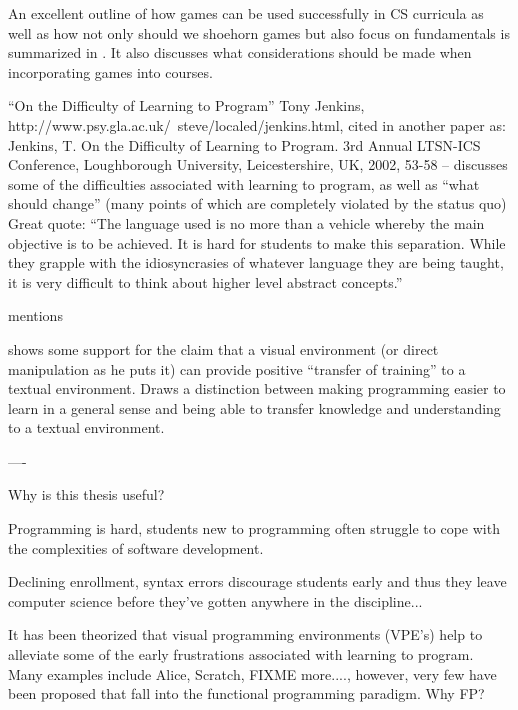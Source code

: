 An excellent outline of how games can be used successfully in CS curricula as well as how not only should we shoehorn games but also focus on fundamentals is summarized in \cite{Bayliss09}.  It also discusses what considerations should be made when incorporating games into courses.

``On the Difficulty of Learning to Program'' Tony Jenkins, http://www.psy.gla.ac.uk/~steve/localed/jenkins.html, cited in another paper as:
Jenkins, T. On the Difficulty of Learning to Program. 3rd Annual LTSN-ICS Conference, Loughborough University, Leicestershire, UK, 2002, 53-58 -- discusses some of the difficulties associated with learning to program, as well as ``what should change'' (many points of which are completely violated by the status quo)  Great quote: ``The language used is no more than a vehicle whereby the main objective is to be achieved. It is hard for students to make this separation. While they grapple with the idiosyncrasies of whatever language they are being taught, it is very difficult to think about higher level abstract concepts.''

\cite{Mahmoud04} mentions 

\cite{Hundhausen09} shows some support for the claim that a visual environment (or direct manipulation as he puts it) can provide positive ``transfer of training'' to a textual environment.  Draws a distinction between making programming easier to learn in a general sense and being able to transfer knowledge and understanding to a textual environment.



----

Why is this thesis useful?

Programming is hard, students new to programming often struggle to cope with the complexities of software development.

Declining enrollment, syntax errors discourage students early and thus they leave computer science before they've
gotten anywhere in the discipline...

It has been theorized that visual programming environments (VPE's) help to alleviate some of the early frustrations
associated with learning to program.  Many examples include Alice, Scratch, FIXME more...., however, very few have
been proposed that fall into the functional programming paradigm.  Why FP?
